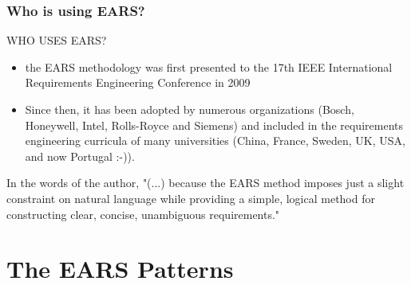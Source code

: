 \documentclass[aspectratio=169]{beamer}
\begin{document}
\begin{frame}
  \frametitle{Who is using EARS?}
  \begin{block}{WHO USES EARS?}
  \begin{itemize}
    \item the EARS methodology was first presented to the 17th IEEE International Requirements Engineering Conference in 2009
    \item Since then, it has been adopted by numerous organizations (Bosch, Honeywell, Intel, Rolls-Royce and Siemens) and included in the requirements engineering curricula of many universities (China, France, Sweden, UK, USA, and now Portugal :-)).  
  \end{itemize}
  In the words of the author, "(...) because the EARS method imposes just a slight constraint on natural language while providing a simple, logical method for constructing clear, concise, unambiguous requirements."
  \end{block} 
\end{frame}

\section*{The EARS Patterns}



    
\end{document}
